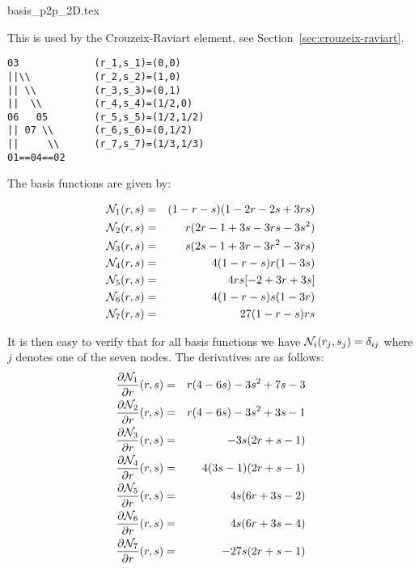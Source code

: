 \begin{flushright} {\tiny {\color{gray} basis\_p2p\_2D.tex}} \end{flushright}

This is used by the Crouzeix-Raviart element, see Section~\ref{sec:crouzeix-raviart}. 

\begin{verbatim}
03             (r_1,s_1)=(0,0)
||\\           (r_2,s_2)=(1,0)
|| \\          (r_3,s_3)=(0,1)
||  \\         (r_4,s_4)=(1/2,0)
06   05        (r_5,s_5)=(1/2,1/2)
|| 07 \\       (r_6,s_6)=(0,1/2)
||     \\      (r_7,s_7)=(1/3,1/3)
01==04==02    
\end{verbatim}

The basis functions are given by:

\begin{mdframed}[backgroundcolor=blue!5]
\begin{eqnarray}
{\mathcal{N}}_1(r,s) &=&  (1-r-s)(1-2r-2s+ 3rs) \\
{\mathcal{N}}_2(r,s) &=& r (2 r -1 + 3s-3rs-3s^2 ) \\
{\mathcal{N}}_3(r,s) &=& s (2s -1 + 3r-3r^2-3rs )\\
{\mathcal{N}}_4(r,s) &=& 4(1-r-s)r(1 -3s ) \\
{\mathcal{N}}_5(r,s) &=& 4rs [-2+3r+3s]\\
{\mathcal{N}}_6(r,s) &=& 4(1-r-s)s(1-3r)\\
{\mathcal{N}}_7(r,s) &=& 27 (1-r-s)rs 
\end{eqnarray}
\end{mdframed}
It is then easy to verify that for all basis functions we have 
${\mathcal{N}}_i(r_j,s_j)=\delta_{ij}$ where $j$ denotes one of the seven nodes. 
The derivatives are as follows:
\begin{eqnarray}
\frac{\partial {\mathcal{N}}_1}{\partial r}(r,s) &=& r(4-6s)-3s^2+7s-3\\
\frac{\partial {\mathcal{N}}_2}{\partial r}(r,s) &=& r(4-6s)-3s^2+3s-1\\
\frac{\partial {\mathcal{N}}_3}{\partial r}(r,s) &=& -3s(2r+s-1)  \\
\frac{\partial {\mathcal{N}}_4}{\partial r}(r,s) &=& 4(3s-1)(2r+s-1) \\
\frac{\partial {\mathcal{N}}_5}{\partial r}(r,s) &=& 4s(6r+3s-2) \\
\frac{\partial {\mathcal{N}}_6}{\partial r}(r,s) &=& 4s(6r+3s-4)\\
\frac{\partial {\mathcal{N}}_7}{\partial r}(r,s) &=& -27s(2r+s-1)
\end{eqnarray}

